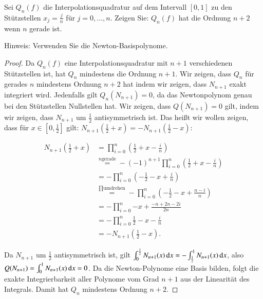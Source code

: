 
\begin{exercise}
  Sei $Q_n(f)$ die Interpolationsquadratur auf dem Intervall $[0,1]$ zu den Stützstellen $x_j=\frac{j}{n}$ für $j=0,\dots,n$. Zeigen Sie: $Q_n(f)$ hat die Ordnung $n+2$ wenn $n$ gerade ist.

  Hinweis: Verwenden Sie die Newton-Basispolynome.
\end{exercise}
\begin{proof}
  Da $Q_n(f)$ eine Interpolationsquadratur mit $n+1$ verschiedenen Stützstellen ist, hat $Q_n$ mindestens die Ordnung $n+1$. Wir zeigen, dass $Q_n$ für gerades $n$ mindestens Ordnung $n+2$ hat indem wir zeigen, dass $N_{n+1}$ exakt integriert wird. Jedenfalls gilt $Q_n(N_{n+1})=0$, da das Newtonpolynom genau bei den Stützstellen Nullstellen hat. Wir zeigen, dass $Q(N_{n+1})=0$ gilt, indem wir zeigen, dass $N_{n+1}$ um $\frac{1}{2}$ antisymmetrisch ist. Das heißt wir wollen zeigen, dass für $x \in [0,\frac{1}{2}]$ gilt: $N_{n+1}(\frac{1}{2}+x)=-N_{n+1}(\frac{1}{2}-x)$:

  \begin{equation*}
    \begin{split}
      N_{n+1}(\frac{1}{2}+x)
      &=\prod_{i=0}^n{(\frac{1}{2}+x - \frac{i}{n})} \\
      &\stackrel{n \text{gerade}}{=} -{(-1)}^{n+1} \prod_{i=0}^n{(\frac{1}{2}+x - \frac{i}{n})} \\
      &=-\prod_{i=0}^n{(-\frac{1}{2}-x + \frac{i}{n})} \\
      &\stackrel{\prod \text{umdrehen}}{=} -\prod_{i=0}^n{(-\frac{1}{2}-x + \frac{n-i}{n})} \\
      &=-\prod_{i=0}^n{-x + \frac{-n+2n-2i}{2n}} \\
      &=-\prod_{i=0}^n{\frac{1}{2}-x - \frac{i}{n}} \\
      &=-N_{n+1}(\frac{1}{2}-x).
    \end{split}
  \end{equation*}

  Da $N_{n+1}$ um $\frac{1}{2}$ antisymmetrisch ist, gilt $\int_0^{\frac{1}{2}}{N_{n+1}(x) \dif x}=-\int_{\frac{1}{2}}^1{N_{n+1}(x) \dif x}$, also $Q(N_{n+1})=\int_0^1{N_{n+1}(x) \dif x} = 0$. Da die Newton-Polynome eine Basis bilden, folgt die exakte Integrierbarkeit aller Polynome vom Grad $n+1$ aus der Linearität des Integrals. Damit hat $Q_n$ mindestens Ordnung $n+2$.
\end{proof}
